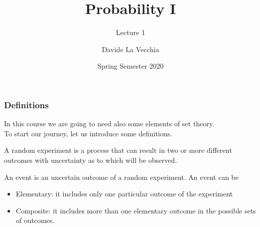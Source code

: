 \documentclass[notes=show,handout]{beamer}
\begin{document}
\title[S110015]{Probability I}
\subtitle{Lecture 1}
\author[La Vecchia]{Davide La Vecchia}
\date{Spring Semester 2020}
\maketitle



\begin{frame}
\frametitle{Definitions}

In this course we are going to need also some elements of \color{blue} set theory.\color{black}\\ 

To start our journey, let us introduce some definitions. 

\begin{definition}
A random experiment  is a process that can result in two or more different outcomes with uncertainty as to which will be observed.
\end{definition}

\begin{definition}
An event is an uncertain outcome of a random experiment. An event can be
\begin{itemize}
\item Elementary: it includes only one particular outcome of the experiment
\item Composite: it includes more than one elementary outcome in the possible sets of outcomes.
\end{itemize}
\end{definition}

\end{frame}
\end{document}
